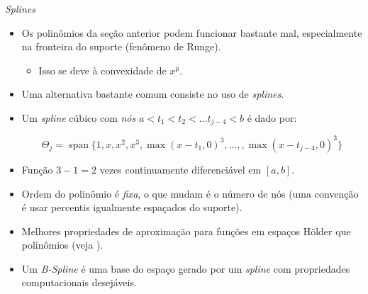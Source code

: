 \documentclass[11pt]{beamer}
\begin{document}
	\begin{frame}{\textit{Splines}}
	\begin{itemize}
		\item Os polinômios da seção anterior podem funcionar bastante mal, especialmente na fronteira do suporte (fenômeno de Runge).
		\begin{itemize}
			\item Isso se deve à convexidade de $x^p$.
		\end{itemize}
		\item Uma alternativa bastante comum consiste no uso de \textit{splines}.
		\item Um \textit{spline} cúbico com \emph{nós} $ a < t_1 < t_2 < \ldots t_{j-4} < b$ é dado por:
		
		$$\Theta_j = \operatorname{span}\{1, x, x^2, x^3, \max(x-t_1,0)^3, \ldots,, \max(x-t_{j-4},0)^3\}$$
		\item Função $3-1=2$ vezes continuamente diferenciável em $[a,b]$.
		\item Ordem do polinômio é \emph{fixa}, o que mudam é o número de nós (uma convenção é usar percentis igualmente espaçados do suporte).
		\item Melhores propriedades de aproximação para funções em espaços H\"{o}lder que polinômios (veja \cite{belloni2015some}).
		\item Um \textit{B-Spline} é uma base do espaço gerado por um \textit{spline} com propriedades computacionais desejáveis. 
	\end{itemize}
	\end{frame}
	
\end{document}
